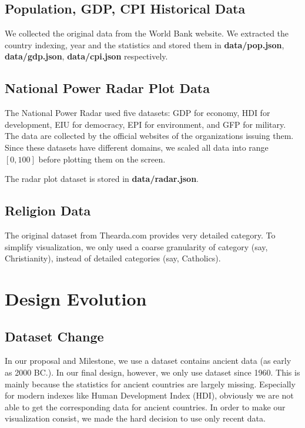 \documentclass[12pt, fullpage,letterpaper]{article}
\begin{document}
\subsection{Population, GDP, CPI Historical Data}
    
    We collected the original data from the World Bank website.
    We extracted the country
    indexing, year and the statistics and stored them in
    \textbf{data/pop.json}, \textbf{data/gdp.json}, \textbf{data/cpi.json}
    respectively.

\subsection{National Power Radar Plot Data}
    The National Power Radar used five datasets: GDP for economy, HDI for
    development, EIU for democracy, EPI for environment, and GFP for military.
    The data are collected by the official websites of the organizations issuing them.
    Since these datasets have different domains, we scaled all data into range
    $[0,100]$ before plotting them on the screen.

    The radar plot dataset is stored in \textbf{data/radar.json}.

\subsection{Religion Data}
    
    The original dataset from Thearda.com provides very detailed category. To
    simplify visualization, we only used a coarse granularity of category (say,
    Christianity), instead of detailed categories (say, Catholics).

\section{Design Evolution}
    \subsection{Dataset Change}
        In our proposal and Milestone, we use a dataset contains ancient data (as early as 2000 BC.).
        In our final design, however, we only use dataset since 1960.
        This is mainly because the statistics for ancient countries are largely missing.
        Especially for modern indexes like Human Development Index (HDI), obviously we are not able to get the corresponding data for ancient countries.
        In order to make our visualization consist, we made the hard decision to use only recent data.
\end{document}
